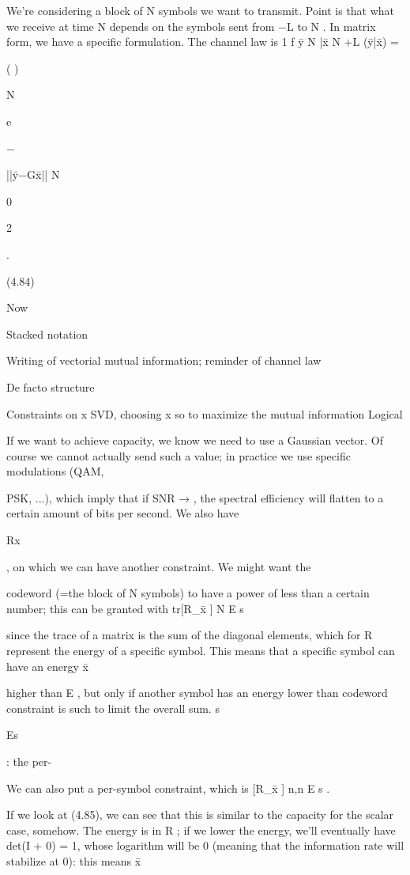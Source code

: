 {{{{{We're considering a block of N symbols we want to transmit.
Point is that what we receive at time N depends on the symbols sent from −L to N . In matrix form, we have a specific formulation.
The channel law is 1 f ȳ N |x̄ N +L (ȳ|x̄) =

( )

N

e

−

||ȳ−\sqrt Gx̄||
N

0

2

.

(4.84)

Now

Stacked notation

Writing of vectorial mutual information;
reminder of channel law

De facto structure

Constraints on x SVD, choosing x so to maximize the mutual information Logical

If we want to achieve capacity, we know we need to use a Gaussian vector. Of course we cannot actually send such a value; in practice we use specific modulations (QAM,

PSK, ...), which imply that if SNR → \infty, the spectral efficiency will flatten to a certain amount of bits per second.
We also have

Rx

, on which we can have another constraint. We might want the

codeword (=the block of N symbols) to have a power of less than a certain number; this can be granted with tr[R_x̄ ] \leq N E s

since the trace of a matrix is the sum of the diagonal elements, which for R represent the energy of a specific symbol. This means that a specific symbol can have an energy x̄

higher than E , but only if another symbol has an energy lower than codeword constraint is such to limit the overall sum.
s

Es

: the per-

We can also put a per-symbol constraint, which is
[R_x̄ ] n,n \leq E s .

If we look at (4.85), we can see that this is similar to the capacity for the scalar case,
somehow.
The energy is in R ; if we lower the energy, we'll eventually have det(I + 0) = 1, whose logarithm will be 0 (meaning that the information rate will stabilize at 0): this means x̄

}}}}}
